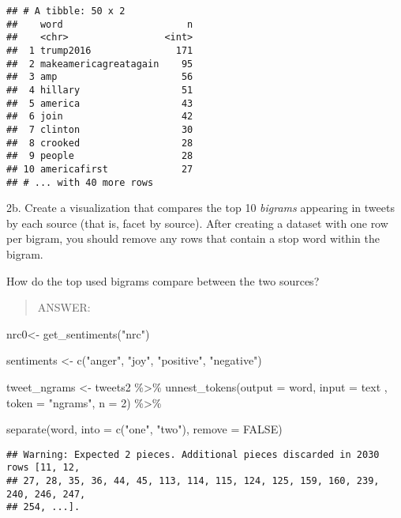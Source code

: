 \documentclass[
]{article}
\newenvironment{Shaded}{\begin{snugshade}}{\end{snugshade}}
\newcommand{\AttributeTok}[1]{\textcolor[rgb]{0.77,0.63,0.00}{#1}}
\newcommand{\ConstantTok}[1]{\textcolor[rgb]{0.00,0.00,0.00}{#1}}
\newcommand{\DecValTok}[1]{\textcolor[rgb]{0.00,0.00,0.81}{#1}}
\newcommand{\FunctionTok}[1]{\textcolor[rgb]{0.00,0.00,0.00}{#1}}
\newcommand{\NormalTok}[1]{#1}
\newcommand{\OtherTok}[1]{\textcolor[rgb]{0.56,0.35,0.01}{#1}}
\newcommand{\SpecialCharTok}[1]{\textcolor[rgb]{0.00,0.00,0.00}{#1}}
\newcommand{\StringTok}[1]{\textcolor[rgb]{0.31,0.60,0.02}{#1}}
\begin{document}
\begin{verbatim}
## # A tibble: 50 x 2
##    word                      n
##    <chr>                 <int>
##  1 trump2016               171
##  2 makeamericagreatagain    95
##  3 amp                      56
##  4 hillary                  51
##  5 america                  43
##  6 join                     42
##  7 clinton                  30
##  8 crooked                  28
##  9 people                   28
## 10 americafirst             27
## # ... with 40 more rows
\end{verbatim}

\newpage

2b. Create a visualization that compares the top 10 \emph{bigrams}
appearing in tweets by each source (that is, facet by source). After
creating a dataset with one row per bigram, you should remove any rows
that contain a stop word within the bigram.

How do the top used bigrams compare between the two sources?

\begin{quote}
ANSWER:
\end{quote}

\begin{Shaded}
\begin{Highlighting}[]
\NormalTok{nrc0}\OtherTok{\textless{}{-}} \FunctionTok{get\_sentiments}\NormalTok{(}\StringTok{"nrc"}\NormalTok{)}

\NormalTok{sentiments  }\OtherTok{\textless{}{-}} \FunctionTok{c}\NormalTok{(}\StringTok{"anger"}\NormalTok{, }\StringTok{"joy"}\NormalTok{, }\StringTok{"positive"}\NormalTok{, }\StringTok{"negative"}\NormalTok{) }


\NormalTok{tweet\_ngrams }\OtherTok{\textless{}{-}}\NormalTok{ tweets2 }\SpecialCharTok{\%\textgreater{}\%}
  \FunctionTok{unnest\_tokens}\NormalTok{(}\AttributeTok{output =}\NormalTok{ word, }\AttributeTok{input =}\NormalTok{ text}
\NormalTok{                , }\AttributeTok{token =} \StringTok{"ngrams"}\NormalTok{, }\AttributeTok{n =} \DecValTok{2}\NormalTok{) }\SpecialCharTok{\%\textgreater{}\%}

\FunctionTok{separate}\NormalTok{(word, }\AttributeTok{into =} \FunctionTok{c}\NormalTok{(}\StringTok{"one"}\NormalTok{, }\StringTok{"two"}\NormalTok{), }\AttributeTok{remove =} \ConstantTok{FALSE}\NormalTok{)}
\end{Highlighting}
\end{Shaded}

\begin{verbatim}
## Warning: Expected 2 pieces. Additional pieces discarded in 2030 rows [11, 12,
## 27, 28, 35, 36, 44, 45, 113, 114, 115, 124, 125, 159, 160, 239, 240, 246, 247,
## 254, ...].
\end{verbatim}
\end{document}
